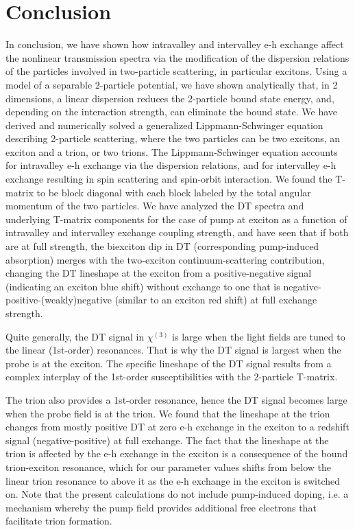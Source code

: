 \documentclass[aps,prb,superscriptaddress,letterpaper,amsmath,amssymb,twocolumn,preprintnumbers]{revtex4}
\begin{document}
\section{Conclusion}
\label{sec:conclusion}


In conclusion, we have shown how intravalley and intervalley e-h exchange affect the nonlinear transmission spectra via the modification of the dispersion relations of the particles involved in two-particle scattering, in particular excitons. Using a model of a separable 2-particle potential,
we have shown analytically that, in 2 dimensions, a linear dispersion reduces the 2-particle bound state energy, and, depending on the interaction strength, can eliminate the bound state. We have derived and numerically solved a generalized Lippmann-Schwinger equation describing 2-particle scattering, where the two particles can be two excitons, an exciton and a trion, or two trions. The Lippmann-Schwinger equation accounts for intravalley e-h exchange via the dispersion relations, and for intervalley e-h exchange resulting in spin scattering and spin-orbit interaction.  We found the T-matrix to be block diagonal with each block labeled by the total angular momentum of the two particles. We have analyzed the DT spectra and underlying T-matrix components for the case of pump at exciton as a function of intravalley and intervalley exchange coupling strength, and have seen that if both are at full strength, the biexciton dip in DT (corresponding pump-induced absorption) merges with the  two-exciton continuum-scattering contribution, changing the DT lineshape at the exciton from  a positive-negative signal (indicating an exciton blue shift)
without exchange to one that is negative-positive-(weakly)negative (similar to an exciton red shift) at full exchange strength.

Quite generally, the DT signal in $\chi^{(3)}$ is large when the light fields are tuned to the linear (1st-order) resonances. That is why the DT signal is largest when the probe is at the exciton. The specific lineshape of the DT signal results from a complex interplay of the 1st-order susceptibilities with the 2-particle T-matrix.

The trion also provides a 1st-order resonance, hence the DT signal becomes large when the probe field is at the trion.
We found that the lineshape at the trion changes from mostly positive DT  at zero e-h exchange in the exciton to a redshift signal (negative-positive) at full exchange. The fact that the lineshape at the trion is affected by the e-h exchange in the exciton is a consequence of the bound trion-exciton resonance, which for our parameter values shifts from below the linear trion resonance to above it as the e-h exchange in the exciton is switched on. Note that the present calculations do not include pump-induced doping, i.e. a mechanism whereby the pump field provides additional free electrons that facilitate trion formation.
\end{document}
